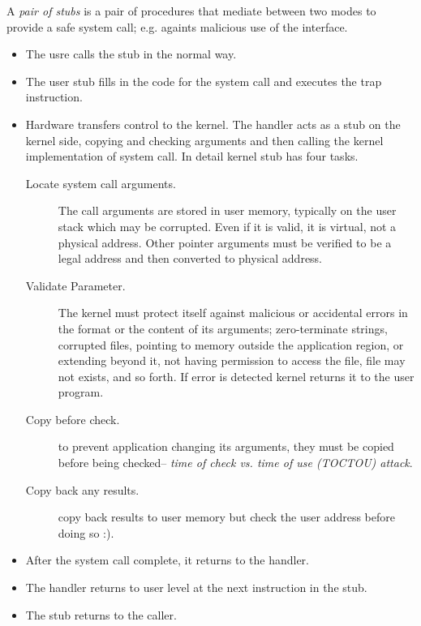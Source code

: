 A \textit{pair of stubs} is a pair of procedures that mediate between two modes to provide a safe system call; e.g. againts malicious use of the interface. 

\begin{itemize}
    \item The usre calls the stub in the normal way.
    \item The user stub fills in the code for the system call and executes the trap instruction.
    \item Hardware transfers control to the kernel. The handler acts as a stub on the kernel side, copying and checking arguments and then calling the kernel implementation of system call. In detail kernel stub has four tasks.
    \begin{description}
        \item [Locate system call arguments.] The call arguments are stored in user memory, typically on the user stack which may be corrupted. Even if it is valid, it is virtual, not a physical address. Other pointer arguments must be verified to be a legal address and then converted to physical address.
        \item [Validate Parameter.] The kernel must protect itself against malicious or accidental errors in the format or the content of its arguments; zero-terminate strings, corrupted files, pointing to memory outside the application region, or extending beyond it, not having permission to access the file, file may not exists, and so forth. If error is detected kernel returns it to the user program.
        \item [Copy before check.] to prevent application changing its arguments, they must be copied before being checked-- \textit{time of check vs. time of use (TOCTOU) attack}.
        \item [Copy back any results.] copy back results to user memory but check the user address before doing so :).
    \end{description}
    \item After the system call complete, it returns to the handler.
    \item The handler returns to user level at the next instruction in the stub.
    \item The stub returns to the caller.
\end{itemize}
